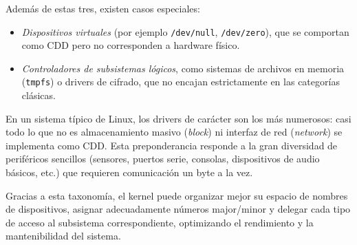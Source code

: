 \medskip

Además de estas tres, existen casos especiales:
\begin{itemize}
  \item \emph{Dispositivos virtuales} (por ejemplo \texttt{/dev/null}, \texttt{/dev/zero}), que se comportan como CDD pero no corresponden a hardware físico.
  \item \emph{Controladores de subsistemas lógicos}, como sistemas de archivos en memoria (\texttt{tmpfs}) o drivers de cifrado, que no encajan estrictamente en las categorías clásicas.
\end{itemize}

En un sistema típico de Linux, los drivers de carácter son los más numerosos: casi todo lo que no es almacenamiento masivo (\emph{block}) ni interfaz de red (\emph{network}) se implementa como CDD. Esta preponderancia responde a la gran diversidad de periféricos sencillos (sensores, puertos serie, consolas, dispositivos de audio básicos, etc.) que requieren comunicación un byte a la vez.

Gracias a esta taxonomía, el kernel puede organizar mejor su espacio de nombres de dispositivos, asignar adecuadamente números major/minor y delegar cada tipo de acceso al subsistema correspondiente, optimizando el rendimiento y la mantenibilidad del sistema.



